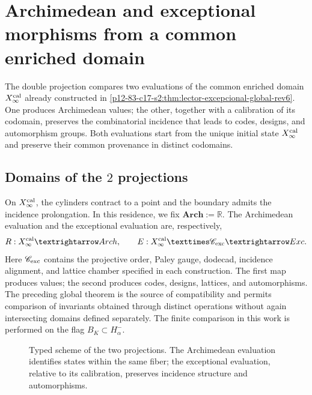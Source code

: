 \label{chap:83-17}

\section{Archimedean and exceptional morphisms from a common enriched domain}
\label{p12-83-c17-s1:chap:doble}

The double projection compares two evaluations of the common enriched domain
\(X_\infty^{\rm cal}\) already constructed in
\cref{p12-83-c17-s2:thm:lector-excepcional-global-rev6}. One produces
Archimedean values; the other, together with a calibration of its codomain, preserves
the combinatorial incidence that leads to codes, designs, and
automorphism groups. Both evaluations start from the unique initial state
\(X_\infty^{\rm cal}\) and preserve their common provenance in distinct
codomains.

\subsection{Domains of the \(2\) projections}

On \(X_\infty^{\rm cal}\), the cylinders contract to a point and the
boundary admits the incidence prolongation. In this residence, we fix
\(\mathbf{Arch}:=\mathbb R\). The Archimedean evaluation and the exceptional
evaluation are, respectively,
\[
\mathfrak R:X_\infty^{\rm cal}\longrightarrow\mathbf{Arch},
\qquad
\mathfrak E:X_\infty^{\rm cal}\times\mathscr C_{\rm exc}
\longrightarrow\mathbf{Exc}.
\]
Here \(\mathscr C_{\rm exc}\) contains the projective order, Paley gauge,
dodecad, incidence alignment, and lattice chamber
specified in each construction. The first map produces values; the
second produces codes, designs, lattices, and automorphisms. The preceding
global theorem is the source of compatibility and permits comparison of
invariants obtained through distinct operations without again intersecting
domains defined separately. The finite comparison in this work is
performed on the flag
\(B_K\subset H^-_\alpha\).

\begin{figure}[H]
\centering
\resizebox{\textwidth}{!}{}
\caption{Typed scheme of the two projections. The Archimedean evaluation
identifies states within the same fiber; the exceptional evaluation, relative
to its calibration, preserves incidence structure and automorphisms.}
\label{p12-83-c17-s1:fig:doble-proyeccion}
\end{figure}

